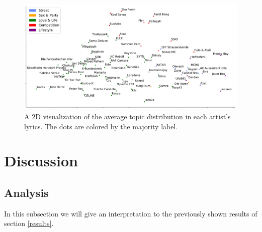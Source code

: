 \documentclass[conference]{IEEEtran}
\begin{document}
\begin{figure}[!t]
\includegraphics[width=\linewidth]{figures/scatter.pdf}
\vspace*{-8mm}
\caption{A 2D visualization of the average topic distribution in each artist's lyrics. The dots are colored by the majority label.}
\label{fig:scatter}
\end{figure}

\section{Discussion}
\subsection{Analysis}
In this subsection we will give an interpretation to the previously shown results of section \ref{results}.
\end{document}
